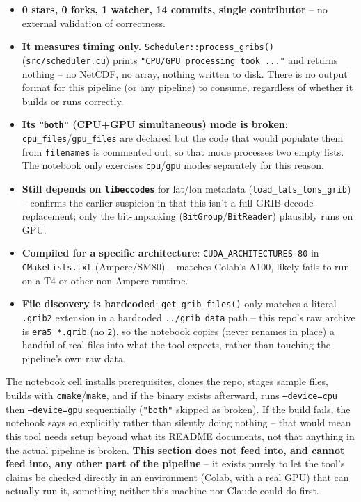 \documentclass[11pt]{article}
\begin{document}
\begin{itemize}[leftmargin=*]
\item \textbf{0 stars, 0 forks, 1 watcher, 14 commits, single
  contributor} -- no external validation of correctness.
\item \textbf{It measures timing only.} \texttt{Scheduler::process\_gribs()}
  (\texttt{src/scheduler.cu}) prints \texttt{"CPU/GPU processing took ..."}
  and returns nothing -- no NetCDF, no array, nothing written to disk.
  There is no output format for this pipeline (or any pipeline) to
  consume, regardless of whether it builds or runs correctly.
\item \textbf{Its \texttt{"both"} (CPU+GPU simultaneous) mode is broken}:
  \texttt{cpu\_files}/\texttt{gpu\_files} are declared but the code that
  would populate them from \texttt{filenames} is commented out, so that
  mode processes two empty lists. The notebook only exercises
  \texttt{cpu}/\texttt{gpu} modes separately for this reason.
\item \textbf{Still depends on \texttt{libeccodes}} for lat/lon metadata
  (\texttt{load\_lats\_lons\_grib}) -- confirms the earlier suspicion in
   that this isn't a full GRIB-decode replacement; only the
  bit-unpacking (\texttt{BitGroup}/\texttt{BitReader}) plausibly runs on
  GPU.
\item \textbf{Compiled for a specific architecture}:
  \texttt{CUDA\_ARCHITECTURES 80} in \texttt{CMakeLists.txt} (Ampere/SM80)
  -- matches Colab's A100, likely fails to run on a T4 or other
  non-Ampere runtime.
\item \textbf{File discovery is hardcoded}: \texttt{get\_grib\_files()}
  only matches a literal \texttt{.grib2} extension in a hardcoded
  \texttt{../grib\_data} path -- this repo's raw archive is
  \texttt{era5\_*.grib} (no \texttt{2}), so the notebook copies (never
  renames in place) a handful of real files into what the tool expects,
  rather than touching the pipeline's own raw data.
\end{itemize}

The notebook cell installs prerequisites, clones the repo, stages sample
files, builds with \texttt{cmake}/\texttt{make}, and if the binary exists
afterward, runs \texttt{--device=cpu} then \texttt{--device=gpu}
sequentially (\texttt{"both"} skipped as broken). If the build fails,
the notebook says so explicitly rather than silently doing nothing --
that would mean this tool needs setup beyond what its README documents,
not that anything in the actual pipeline is broken. \textbf{This section
does not feed into, and cannot feed into, any other part of the
pipeline} -- it exists purely to let the tool's claims be checked
directly in an environment (Colab, with a real GPU) that can actually
run it, something neither this machine nor Claude could do first.
\end{document}
